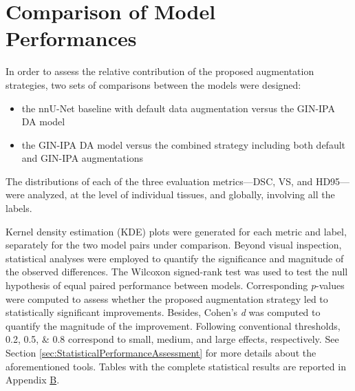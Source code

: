 \section{Comparison of Model Performances} \label{sec:ComparisonOfModelPerformances}
In order to assess the relative contribution of the proposed augmentation strategies, two sets of comparisons between the models were designed:
\begin{itemize}
  \item the nnU-Net baseline with default data augmentation versus the GIN-IPA DA model
  \item the GIN-IPA DA model versus the combined strategy including both default and GIN-IPA augmentations
\end{itemize}
The distributions of each of the three evaluation metrics---DSC, VS, and HD95---were analyzed, at the level of individual tissues, and globally, involving all the labels.

Kernel density estimation (KDE) plots were generated for each metric and label, separately for the two model pairs under comparison. Beyond visual inspection, statistical analyses were employed to quantify the significance and magnitude of the observed differences. The Wilcoxon signed-rank test was used to test the null hypothesis of equal paired performance between models. Corresponding \textit{p}-values were computed to assess whether the proposed augmentation strategy led to statistically significant improvements. Besides, Cohen's \textit{d} was computed to quantify the magnitude of the improvement. Following conventional thresholds, \numlist{0.2; 0.5; 0.8} correspond to small, medium, and large effects, respectively. See Section \ref{sec:StatisticalPerformanceAssessment} for more details about the aforementioned tools. Tables with the complete statistical results are reported in Appendix \hyperref[app:SupplementaryTables]{B}.

